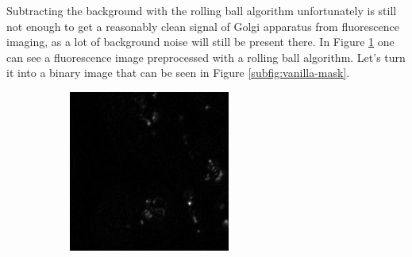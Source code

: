 Subtracting the background with the rolling ball algorithm unfortunately is still not enough to get a reasonably clean signal of Golgi apparatus from fluorescence imaging, as a lot of background noise will still be present there. In Figure \ref{subfig:vanilla} one can see a fluorescence image preprocessed with a rolling ball algorithm. Let's turn it into a binary image that can be seen in Figure \ref{subfig:vanilla-mask}. 
\begin{figure}[htb]
	\centering
	\begin{subfigure}[b]{0.22\textwidth}
		\centering
		\includegraphics[width=\textwidth]{bilder/preprocessing/crop_golgi_not_full_processed.png}
		\caption{}
		\label{subfig:vanilla}
	\end{subfigure}
	\hfill
	\begin{subfigure}[b]{0.22\textwidth}
		\centering

\end{subfigure}
\end{figure}
